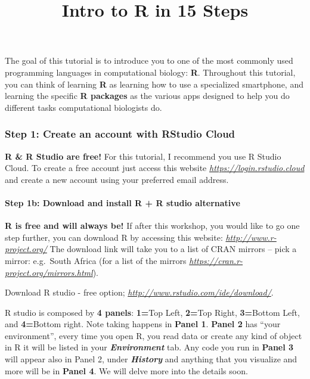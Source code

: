 \documentclass[]{article}
\title{Intro to R in 15 Steps}
\author{}
\date{\vspace{-2.5em}}
\let\oldparagraph\paragraph
\renewcommand{\paragraph}[1]{\oldparagraph{#1}\mbox{}}
\begin{document}
\maketitle

The goal of this tutorial is to introduce you to one of the most
commonly used programming languages in computational biology:
\textbf{R}. Throughout this tutorial, you can think of learning
\textbf{R} as learning how to use a specialized smartphone, and learning
the specific \textbf{R packages} as the various apps designed to help
you do different tasks computational biologists do.

\hypertarget{step-1-create-an-account-with-rstudio-cloud}{%
\subsubsection{Step 1: Create an account with RStudio
Cloud}\label{step-1-create-an-account-with-rstudio-cloud}}

\textbf{R \& R Studio are free!} For this tutorial, I recommend you use
R Studio Cloud. To create a free account just access this website
\emph{\url{https://login.rstudio.cloud}} and create a new account using
your preferred email address.

\hypertarget{step-1b-download-and-install-r-r-studio-alternative}{%
\paragraph{Step 1b: Download and install R + R studio
alternative}\label{step-1b-download-and-install-r-r-studio-alternative}}

\textbf{R is free and will always be!} If after this workshop, you would
like to go one step further, you can download R by accessing this
website: \emph{\url{http://www.r-project.org/}} The download link will
take you to a list of CRAN mirrors -- pick a mirror: e.g.~South Africa
(for a list of the mirrors
\emph{\url{https://cran.r-project.org/mirrors.html}}).

Download R studio - free option;
\emph{\url{http://www.rstudio.com/ide/download/}}.

R studio is composed by \textbf{4 panels}: \textbf{1=}Top Left,
\textbf{2=}Top Right, \textbf{3=}Bottom Left, and \textbf{4=}Bottom
right. Note taking happens in \textbf{Panel 1}. \textbf{Panel 2} has
``your environment'', every time you open R, you read data or create any
kind of object in R it will be listed in your
\textbf{\emph{Environment}} tab. Any code you run in \textbf{Panel 3}
will appear also in Panel 2, under \textbf{\emph{History}} and anything
that you visualize and more will be in \textbf{Panel 4}. We will delve
more into the details soon.
\end{document}
